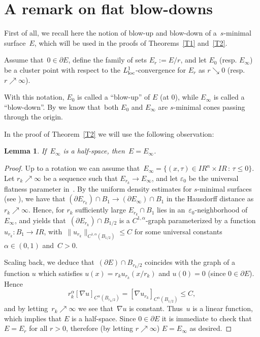 \documentclass[11pt]{amsart}
\newtheorem{lemma}[theorem]{Lemma}
\begin{document}
\section{A remark on flat blow-downs}\label{S:B}

First of all, we recall here the notion of blow-up and blow-down of a~$s$-minimal surface~$E$, which
will be used in the proofs of Theorems~\ref{T1} and~\ref{T2}. 

Assume that~$0\in\partial E$, define the family of sets $E_r:=E/r$, and let $E_0$ (resp. $E_\infty$) be a cluster point with respect to the $L^1_{\rm loc}$-convergence for
$E_r$ as $r \searrow 0$ (resp. $r\nearrow \infty$).

With this notation, $E_0$ is called a ``blow-up'' of $E$ (at $0$), while $E_\infty$ is called a ``blow-down''.
By \cite[Theorem 9.2]{CRS} we know that~both $E_0$ and $E_\infty$ are
$s$-minimal cones passing through the origin.

In the proof of Theorem~\ref{T2} we will use the following observation:

\begin{lemma}\label{BL}
If~$E_\infty$ is a half-space, then~$E=E_\infty$.
\end{lemma}

\begin{proof} Up to a rotation we can assume that~$E_\infty=\{(x,\tau)\in{{I\!\!R}}^n\times{{I\!\!R}} \,:\, \tau{\leqslant} 0\}$.
Let $r_k \nearrow \infty$ be a sequence such that $E_{r_k} \to E_\infty$, and let 
${\varepsilon}_0$ be the universal flatness parameter in~\cite[Theorem~6.1]{CRS}.
By the uniform density estimates for $s$-minimal surfaces (see \cite[Theorem 4.1]{CRS}), we have
that $(\partial E_{r_k}) \cap B_1 \to (\partial E_\infty)\cap B_1$ in the Hausdorff distance as $r_k \nearrow \infty$.
Hence, for $r_k$ sufficiently large
$E_{r_k}\cap B_1$ lies in an~${\varepsilon}_0$-neighborhood of~$E_\infty$,
and \cite[Theorem~6.1]{CRS} yields that~$(\partial E_{r_k})\cap B_{1/2}$ is a $C^{1,\alpha}$-graph parameterized by a function $u_{r_k}:
B_1 \to{{I\!\!R}}$, with~$\|u_{r_k}\|_{C^{1,\alpha}(B_{1/2})}{\leqslant} C$
for some universal constants~$\alpha\in(0,1)$
and~$C>0$.

Scaling back, we deduce that~$(\partial E)\cap B_{r_k/2}$
coincides with the graph of
a function $u$ which satisfies $u(x)=r_k u_{r_k} (x/r_k)$
and $u(0)=0$ (since $0 \in \partial E$).
Hence
$$r_k^\alpha [\nabla u]_{C^{\alpha}(B_{r_k/2})}= [\nabla u_{r_k}]_{C^{\alpha}(B_{1/2})}{\leqslant} C,$$
and by letting~$r_k\nearrow \infty$ we see that~$\nabla u$ is constant. Thus~$u$
is a linear function, which implies that $E$ is a half-space.
Since $0 \in \partial E$ it is immediate to check that $E=E_r$ for all $r>0$,
therefore (by letting $r \nearrow \infty$) $E=E_\infty$ as desired.
\end{proof}
\end{document}
